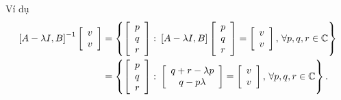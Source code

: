\begin{frame}{Ví dụ}
    \begin{align}
        \left[A-\lambda I,B\right]^{-1}\left[\begin{array}{c}
        v\\
        v
        \end{array}\right]&=\left\{ \left[\begin{array}{c}
        p\\
        q\\
        r
        \end{array}\right]\colon\left[A-\lambda I,B\right]\left[\begin{array}{c}
        p\\
        q\\
        r
        \end{array}\right]=\left[\begin{array}{c}
        v\\
        v
        \end{array}\right],\,\forall p,q,r\in\mathbb{C}\right\} \nonumber\\
        &=\left\{ \left[\begin{array}{c}
        p\\
        q\\
        r
        \end{array}\right]\colon\left[\begin{array}{c}
        q+r-\lambda p\\
        q-p\lambda
        \end{array}\right]=\left[\begin{array}{c}
        v\\
        v
        \end{array}\right],\,\forall p,q,r\in\mathbb{C}\right\} .
    \end{align}
\end{frame}

